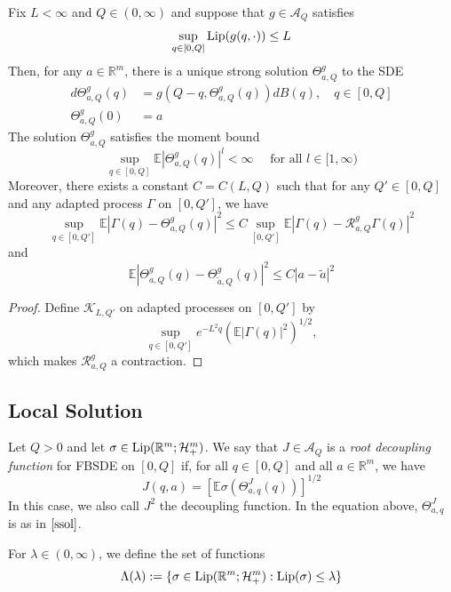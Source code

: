 \begin{proposition}
    Fix $L<\infty$ and $Q\in(0,\infty)$ and suppose that $g \in \mathcal{A}_Q$ satisfies \[
    \sup\limits_{q\in[0,Q]} \text{Lip}(g(q,\cdot)) \leq L\]
    Then, for any $a\in\mathbb{R}^m$, there is a unique strong solution $\Theta^g_{a,Q}$ to the SDE
    \[
    \begin{aligned}
        d\Theta^g_{a,Q}(q) &= g(Q-q,\Theta^g_{a,Q}(q))dB(q),\quad q\in[0,Q] \\
        \Theta^g_{a,Q}(0) &= a \label{ssol}
    \end{aligned}
    \]
The solution $\Theta^g_{a,Q}$ satisfies the moment bound
    \[
    \sup_{q\in[0,Q]} \mathbb{E}|\Theta^g_{a,Q}(q)|^l<\infty\quad\text{ for all }l\in[1,\infty)
    \]
Moreover, there exists a constant $C=C(L,Q)$ such that for any $Q' \in [0,Q]$ and any adapted process
$\Gamma$ on $[0,Q']$, we have
    \[
    \sup_{q\in[0,Q']} \mathbb{E}|\Gamma(q) - \Theta^g_{a,Q}(q)|^2 \leq C \sup_{[0,Q']}\mathbb{E}|\Gamma(q) - \mathcal{R}^g_{a,Q}\Gamma(q)|^2
    \]
    and
    \[
    \mathbb{E}|\Theta^g_{a,Q}(q) - \Theta^g_{\widetilde{a},Q}(q)|^2 \leq C|a-\widetilde{a}|^2
    \]
\end{proposition}
\begin{proof}
    Define $\mathcal{K}_{L,Q'}$ on adapted processes on $[0,Q']$ by \[\sup\limits_{q\in [0,Q']} e^{-L^2q}\left(\mathbb{E}|\Gamma(q)|^2\right)^{1/2},\] which makes $\mathcal R_{a,Q}^g$ a contraction.
\end{proof}

\subsection{Local Solution}

\begin{definition}
     Let $Q>0$ and let $\sigma\in\text{Lip}(\mathbb{R}^m;\mathcal{H}_+^m)$. We say that $J\in \mathcal{A}_Q$ is a \emph{root decoupling function} for FBSDE on $[0,Q]$ if, for all $q \in [0,Q]$ and all $a \in \mathbb{R}^m$, we have
     \[J(q,a) = [\mathbb{E}\sigma(\Theta^J_{a,q}(q))]^{1/2}\]
    In this case, we also call $J^2$ the decoupling function. In the equation above, $\Theta^J_{a,q}$ is as in $\eqref{ssol}$.
\end{definition}

\begin{definition}
    For $\lambda \in (0,\infty)$, we define the set of functions
    \[
    \Lambda(\lambda):= \{\sigma \in \text{Lip}(\mathbb{R}^m;\mathcal{H}_+^m):\text{Lip}(\sigma) \leq \lambda\}
    \]
\end{definition}

